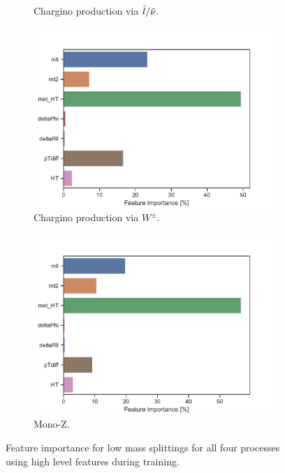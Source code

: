 \begin{figure}[H]
\begin{subfigure}[t!]{0.49\textwidth}
        \caption{Chargino production via $\Tilde{l}/\Tilde{\nu}$.}
        \label{fig:}
    \end{subfigure}
    \begin{subfigure}[t!]{0.49\textwidth}
        \includegraphics[width = \textwidth]{Figures/WW/BDT/High_level/Inter/featureImportance.pdf}
        \caption{Chargino production via $W^\pm$.}
        \label{fig:}
    \end{subfigure}
    \begin{subfigure}[t!]{0.49\textwidth}
        \includegraphics[width = \textwidth]{Figures/Mono_Z/ML/BDT/High_level/Inter/featureImportance.pdf}
        \caption{Mono-Z.}
        \label{fig:}
    \end{subfigure}
    \caption{Feature importance for low mass splittings for all four processes using high level features during training.}
    \label{fig:Non}
\end{figure}


